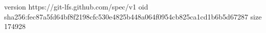 version https://git-lfs.github.com/spec/v1
oid sha256:fec87a5fd64bf8f2198cfc530e4825b448a064f0954cb825ca1cd1b6b5d67287
size 174928
